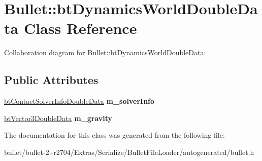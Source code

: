 \hypertarget{class_bullet_1_1bt_dynamics_world_double_data}{\section{Bullet\+:\+:bt\+Dynamics\+World\+Double\+Data Class Reference}
\label{class_bullet_1_1bt_dynamics_world_double_data}
}


Collaboration diagram for Bullet\+:\+:bt\+Dynamics\+World\+Double\+Data\+:
\subsection*{Public Attributes}
\begin{DoxyCompactItemize}
\item 
\hypertarget{class_bullet_1_1bt_dynamics_world_double_data_a80e128f651d8a8374cdcc242ad343187}{\hyperlink{class_bullet_1_1bt_contact_solver_info_double_data}{bt\+Contact\+Solver\+Info\+Double\+Data} {\bfseries m\+\_\+solver\+Info}}\label{class_bullet_1_1bt_dynamics_world_double_data_a80e128f651d8a8374cdcc242ad343187}

\item 
\hypertarget{class_bullet_1_1bt_dynamics_world_double_data_a435867dac64148f0ce98002bb4f7c00e}{\hyperlink{class_bullet_1_1bt_vector3_double_data}{bt\+Vector3\+Double\+Data} {\bfseries m\+\_\+gravity}}\label{class_bullet_1_1bt_dynamics_world_double_data_a435867dac64148f0ce98002bb4f7c00e}

\end{DoxyCompactItemize}


The documentation for this class was generated from the following file\+:\begin{DoxyCompactItemize}
\item 
bullet/bullet-\/2.-\/r2704/\+Extras/\+Serialize/\+Bullet\+File\+Loader/autogenerated/bullet.\+h\end{DoxyCompactItemize}
